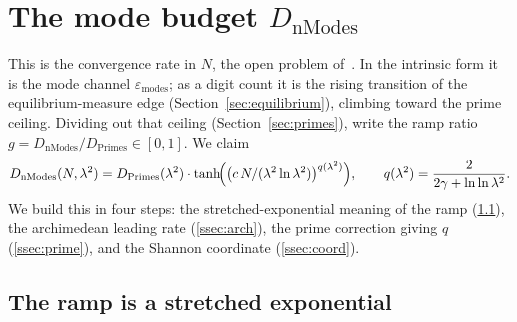 \documentclass[11pt,a4paper]{article}
\begin{document}
\section{The mode budget $D_{\mathrm{nModes}}$}\label{sec:nmodes}

This is the convergence rate in $N$, the open problem of~\cite{CCM2025}. In
the intrinsic form it is the mode channel $\varepsilon_{\mathrm{modes}}$; as a
digit count it is the rising transition of the equilibrium-measure edge
(Section~\ref{sec:equilibrium}), climbing toward the prime ceiling.
Dividing out that ceiling (Section~\ref{sec:primes}), write the ramp ratio
$g=D_{\mathrm{nModes}}/D_{\mathrm{Primes}}\in[0,1]$. We claim
\begin{equation}\label{eq:nmodes}
  D_{\mathrm{nModes}}(N,\lambda^2)=D_{\mathrm{Primes}}(\lambda^2)\cdot
  \tanh\!\Bigl(\bigl(c\,N/(\lambda^2\ln\lambda^2)\bigr)^{q(\lambda^2)}\Bigr),
  \qquad q(\lambda^2)=\frac{2}{2\gamma+\ln\ln\lambda^2}.
\end{equation}
We build this in four steps: the stretched-exponential meaning of the ramp
(\ref{ssec:stretch}), the archimedean leading rate (\ref{ssec:arch}), the prime
correction giving $q$ (\ref{ssec:prime}), and the Shannon coordinate
(\ref{ssec:coord}).

\subsection{The ramp is a stretched exponential}\label{ssec:stretch}
\end{document}
